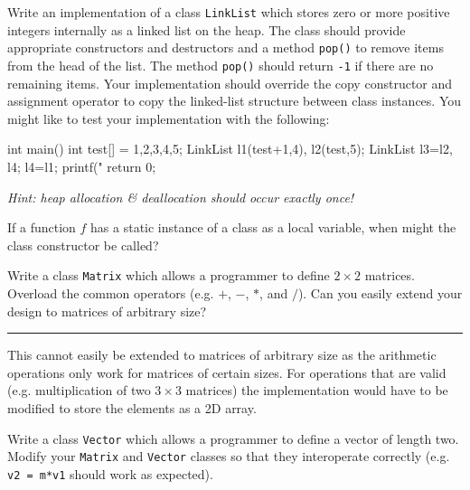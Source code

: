 \documentclass{supervision}
\begin{document}
\begin{questions}
  \question Write an implementation of a class \lstinline|LinkList| which
    stores zero or more positive integers internally as a linked list on the
    heap. The class should provide appropriate constructors and destructors
    and a method \lstinline|pop()| to remove items from the head of the list.
    The method \lstinline|pop()| should return \lstinline|-1| if there are no
    remaining items. Your implementation should override the copy constructor
    and assignment operator to copy the linked-list structure between class
    instances. You might like to test your implementation with the following:

    \begin{cpp}
    int main() {
        int test[] = {1,2,3,4,5};
        LinkList l1(test+1,4), l2(test,5);
        LinkList l3=l2, l4;
        l4=l1;
        printf("%
        return 0;
    }
    \end{cpp}

    \textit{Hint: heap allocation \& deallocation should occur exactly once!}

    \begin{solution}
    \end{solution}

  \question If a function $f$ has a static instance of a class as a local
    variable, when might the class constructor be called?
    \begin{solution}
    \end{solution}

  \question Write a class \lstinline|Matrix| which allows a programmer to
    define $2 \times 2$ matrices. Overload the common operators (e.g. $+$,
    $-$, $*$, and $/$). Can you easily extend your design to matrices of
    arbitrary size?

    \begin{solution}
      \noindent\rule{\linewidth}{0.4pt}
      This cannot easily be extended to matrices of arbitrary size as the
      arithmetic operations only work for matrices of certain sizes. For
      operations that are valid (e.g. multiplication of two $3 \times 3$
      matrices) the implementation would have to be modified to store the
      elements as a 2D array.
    \end{solution}

    \question Write a class \lstinline|Vector| which allows a programmer to
      define a vector of length two. Modify your \lstinline|Matrix| and
      \lstinline|Vector| classes so that they interoperate correctly (e.g.
      \lstinline|v2 = m*v1| should work as expected).


\end{questions}
\end{document}
